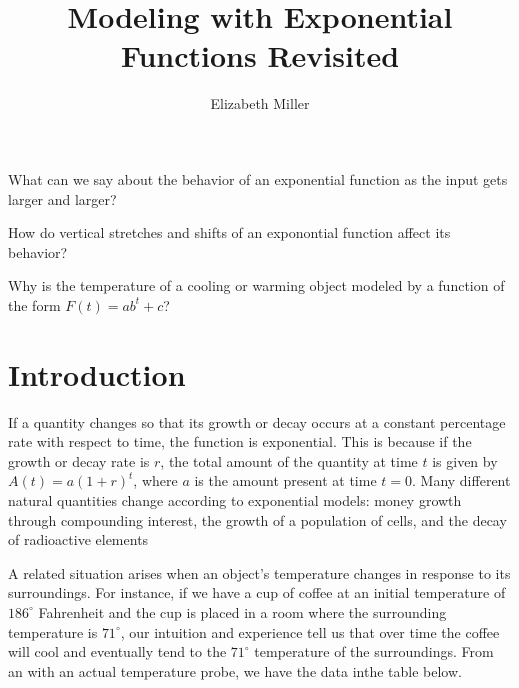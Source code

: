 \documentclass[nooutcomes]{ximera}
\author{Elizabeth Miller}
\title{Modeling with Exponential Functions Revisited}
\begin{document}
\begin{abstract}
  
\end{abstract}
\maketitle



\begin{motivatingQuestions}
\item What can we say about the behavior of an exponential function as the input gets larger and larger?
\item How do vertical stretches and shifts of an exponontial function affect its behavior?
\item Why is the temperature of a cooling or warming object modeled by a function of the form \(F(t) = ab^t + c\)?
\end{motivatingQuestions}



\section{Introduction}
If a quantity changes so that its growth or decay occurs at a constant percentage rate with respect to time, the function is exponential.  This is because if the growth or decay rate is \(r\), the total amount of the quantity at time \(t\) is given by \(A(t) = a(1+r)^t\), where \(a\) is the amount present at time \(t = 0\).  Many different natural quantities change according to exponential models:  money growth through compounding interest, the growth of a population of cells, and the decay of radioactive elements

A related situation arises when an object's temperature changes in response to its surroundings.  For instance, if we have a cup of coffee at an initial temperature of \(186^\circ\) Fahrenheit and the cup is placed in a room where the surrounding temperature is \(71^\circ\), our intuition and experience tell us that over time the coffee will cool and eventually tend to the \(71^\circ\) temperature of the surroundings.  From an  with an actual temperature probe, we have the data inthe table below.
\end{document}

